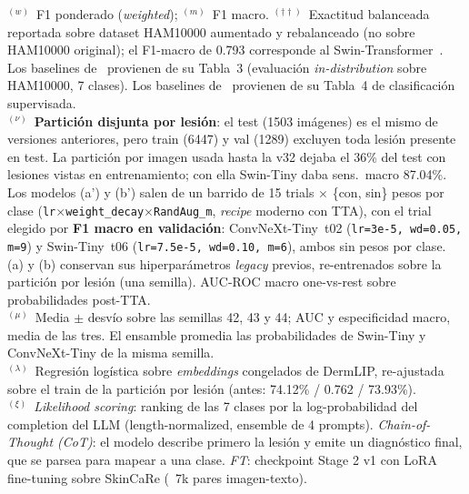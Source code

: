 \begin{table}[htbp]
{\begin{tabular}{@{}llccrrrrr@{}}
\bottomrule
\end{tabular}%
}
\vspace{4pt}
\begin{minipage}{\textwidth}
  \footnotesize
  $^{(w)}$~F1 ponderado (\textit{weighted}); $^{(m)}$~F1 macro.
  $^{(\dagger\dagger)}$~Exactitud balanceada reportada sobre dataset HAM10000
  aumentado y rebalanceado (no sobre HAM10000 original);
  el F1-macro de 0.793 corresponde al Swin-Transformer~\cite{SkinSavvy22025}.\\
  Los baselines de~\cite{SkinR12025} provienen de su Tabla~3
  (evaluación \textit{in-distribution} sobre HAM10000, 7 clases).
  Los baselines de~\cite{MMSkin2025} provienen de su Tabla~4 de clasificación supervisada.\\
  $^{(\nu)}$~\textbf{Partición disjunta por lesión}: el test (1503 imágenes) es el mismo de versiones
  anteriores, pero train (6447) y val (1289) excluyen toda lesión presente en test. La partición por
  imagen usada hasta la v32 dejaba el 36\% del test con lesiones vistas en entrenamiento; con ella Swin-Tiny
  daba sens.\ macro 87.04\%. Los modelos (a') y (b') salen de un barrido de 15 trials
  $\times$ \{con, sin\} pesos por clase (\texttt{lr}$\times$\texttt{weight\_decay}$\times$\texttt{RandAug\_m},
  \textit{recipe} moderno con TTA), con el trial elegido por \textbf{F1 macro en validación}:
  ConvNeXt-Tiny~t02 (\texttt{lr=3e-5, wd=0.05, m=9}) y Swin-Tiny~t06 (\texttt{lr=7.5e-5, wd=0.10, m=6}),
  ambos sin pesos por clase. (a) y (b) conservan sus hiperparámetros \textit{legacy} previos, re-entrenados
  sobre la partición por lesión (una semilla). AUC-ROC macro one-vs-rest sobre probabilidades post-TTA.\\[4pt]
  $^{(\mu)}$~Media $\pm$ desvío sobre las semillas 42, 43 y 44; AUC y especificidad macro, media de las
  tres. El ensamble promedia las probabilidades de Swin-Tiny y ConvNeXt-Tiny de la misma semilla.\\[4pt]
  $^{(\lambda)}$~Regresión logística sobre \textit{embeddings} congelados de DermLIP, re-ajustada sobre el
  train de la partición por lesión (antes: 74.12\% / 0.762 / 73.93\%).\\[4pt]
  $^{(\xi)}$~\textit{Likelihood scoring}: ranking de las 7 clases por la log-probabilidad
  del completion del LLM (length-normalized, ensemble de 4 prompts).
  \textit{Chain-of-Thought (CoT)}: el modelo describe primero la lesión y emite
  un diagnóstico final, que se parsea para mapear a una clase.
  \textit{FT}: checkpoint Stage 2 v1 con LoRA fine-tuning sobre SkinCaRe (~7k pares imagen-texto).\\[4pt]

\end{minipage}
\end{table}

